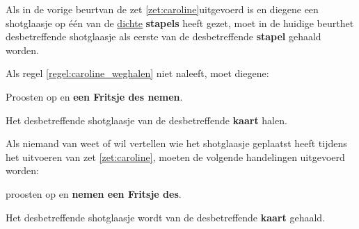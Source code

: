 
\vervolgLijst{}
\item \label{regel:caroline_weghalen} Als in de vorige beurt\footnotemark[4] van de \huidigeSpeler zet \ref{zet:caroline}\footnotemark[1] uitgevoerd is en diegene een shotglaasje op \'e\'en van de \ul{dichte} \textbf{stapels} heeft gezet, moet in de huidige beurt\footnotemark[4] het desbetreffende shotglaasje als eerste van de desbetreffende \textbf{stapel} gehaald worden.
\eindLijst{}

\vervolgLijst{}
\item Als \eenSpeler regel \ref{regel:caroline_weghalen} niet naleeft, moet diegene:
\puntLijst{}
\item Proosten op  en \textbf{een Fritsje des nemen}\footnotemark[3].
\item Het desbetreffende shotglaasje van de desbetreffende \textbf{kaart} halen.
\eindPuntLijst{}
\eindLijst{}

\vervolgLijst{}
\item Als niemand van \alleSpelers weet of wil vertellen wie het shotglaasje geplaatst heeft tijdens het uitvoeren van zet \ref{zet:caroline}\footnotemark[1], moeten de volgende handelingen uitgevoerd worden:
\puntLijst{}
\item \AlleSpelers proosten op  en \textbf{nemen een Fritsje des}\footnotemark[3].
\item Het desbetreffende shotglaasje wordt van de desbetreffende \textbf{kaart} gehaald.
\eindPuntLijst{}
\eindLijst{}



